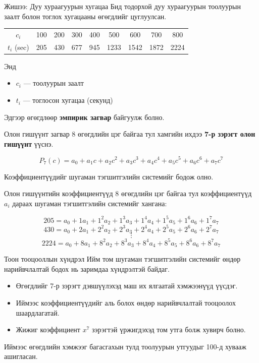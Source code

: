 \documentclass[dvipsnames]{beamer}
\begin{document}
\begin{frame}{Жишээ: Дуу хураагуурын хугацаа}
\small
Бид тодорхой дуу хураагуурын тоолуурын заалт болон тоглох хугацааны
өгөгдлийг цуглуулсан.

\begin{center}
\begin{tabular}{c c c c c c c c c}
$c_i$ & 100 & 200 & 300 & 400 & 500 & 600 & 700 & 800 \\
$t_i$ (sec) & 205 & 430 & 677 & 945 & 1233 & 1542 & 1872 & 2224
\end{tabular}
\end{center}

Энд
\begin{itemize}
\item $c_i$ --- тоолуурын заалт
\item $t_i$ --- тоглосон хугацаа (секунд)
\end{itemize}

Эдгээр өгөгдлөөр \textbf{эмпирик загвар} байгуулж болно.
\end{frame}

\begin{frame}{Олон гишүүнт загвар}
\small
8 өгөгдлийн цэг байгаа тул хамгийн ихдээ \textbf{7-р зэрэгт олон
гишүүнт} үүснэ.

\[
P_7(c)
= a_0 + a_1 c + a_2 c^2 + a_3 c^3
+ a_4 c^4 + a_5 c^5 + a_6 c^6 + a_7 c^7
\]

Коэффициентүүдийг шугаман тэгшитгэлийн системийг бодож олно.
\end{frame}

\begin{frame}{Олон гишүүнтийн коэффициентүүд}
\small
8 өгөгдлийн цэг байгаа тул коэффициентүүд $a_i$ дараах шугаман
тэгшитгэлийн системийг хангана:

\[
205 = a_0 + 1a_1 + 1^2 a_2 + 1^3 a_3 + 1^4 a_4 + 1^5 a_5 + 1^6 a_6 + 1^7 a_7
\]
\[
430 = a_0 + 2a_1 + 2^2 a_2 + 2^3 a_3 + 2^4 a_4 + 2^5 a_5 + 2^6 a_6 + 2^7 a_7
\]
\[
\vdots
\]
\[
2224 = a_0 + 8a_1 + 8^2 a_2 + 8^3 a_3 + 8^4 a_4 + 8^5 a_5 + 8^6 a_6 + 8^7 a_7
\]
\end{frame}

\begin{frame}{Тоон тооцооллын хүндрэл}
\small
Ийм том шугаман тэгшитгэлийн системийг өндөр нарийвчлалтай бодох нь
заримдаа хүндрэлтэй байдаг.

\begin{itemize}
\item Өгөгдлийг 7-р зэрэгт дэвшүүлэхэд маш их ялгаатай хэмжээнүүд үүсдэг.
\item Иймээс коэффициентүүдийг аль болох өндөр нарийвчлалтай тооцоолох
      шаардлагатай.
\item Жижиг коэффициент $x^7$ зэрэгтэй үржигдэхэд том утга болж хувирч
      болно.
\end{itemize}

Иймээс өгөгдлийн хэмжээг багасгахын тулд тоолуурын утгуудыг 100-д
хувааж ашигласан.
\end{frame}
\end{document}
